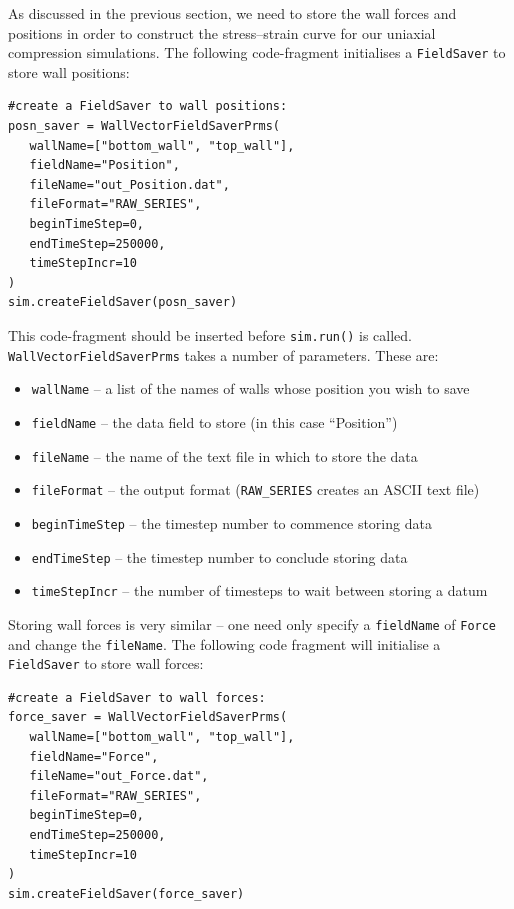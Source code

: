 As discussed in the previous section, we need to store the wall forces and positions in order to construct the stress--strain curve for our uniaxial compression simulations. The following code-fragment initialises a \texttt{FieldSaver} to store wall positions:

\begin{verbatim} 
#create a FieldSaver to wall positions:
posn_saver = WallVectorFieldSaverPrms(
   wallName=["bottom_wall", "top_wall"],
   fieldName="Position",
   fileName="out_Position.dat",
   fileFormat="RAW_SERIES",
   beginTimeStep=0,
   endTimeStep=250000,
   timeStepIncr=10
)
sim.createFieldSaver(posn_saver)
\end{verbatim} 

\noindent
This code-fragment should be inserted before \texttt{sim.run()} is called.  \texttt{WallVec\+torFieldSav\+erPrms} takes a number of parameters. These are:

\begin{itemize}
\item \texttt{wallName} -- a list of the names of walls whose position you wish to save
\item \texttt{fieldName} -- the data field to store (in this case ``Position'')
\item \texttt{fileName} -- the name of the text file in which to store the data
\item \texttt{fileFormat} -- the output format (\texttt{RAW\_SERIES} creates an ASCII text file)
\item \texttt{beginTimeStep} -- the timestep number to commence storing data
\item \texttt{endTimeStep} -- the timestep number to conclude storing data
\item \texttt{timeStepIncr} -- the number of timesteps to wait between storing a datum
\end{itemize}

\noindent
Storing wall forces is very similar -- one need only specify a \texttt{fieldName} of \texttt{Force} and change the \texttt{fileName}. The following code fragment will initialise a \texttt{FieldSaver} to store wall forces:

\begin{verbatim}
#create a FieldSaver to wall forces:
force_saver = WallVectorFieldSaverPrms(
   wallName=["bottom_wall", "top_wall"],
   fieldName="Force",
   fileName="out_Force.dat",
   fileFormat="RAW_SERIES",
   beginTimeStep=0,
   endTimeStep=250000,
   timeStepIncr=10
)
sim.createFieldSaver(force_saver)
\end{verbatim}

